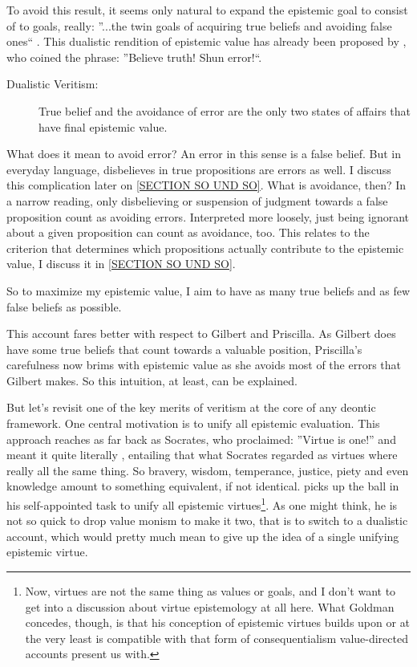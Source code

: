 \documentclass[12pt,numbers=noenddot]{scrartcl}
\begin{document}
To avoid this result, it seems only natural to expand the epistemic goal to consist of to goals, really: ”...the twin goals of acquiring true beliefs and avoiding false ones“ \textcite[339]{Berker2013-BERETA-2}. This dualistic rendition of epistemic value has already been proposed by \textcite[17]{James1896-JAMTWT-19}, who coined the phrase: ”Believe truth! Shun error!“.

\begin{description}
    \item[Dualistic Veritism:] True belief and the avoidance of error are the only two states of affairs that have final epistemic value.
\end{description}
\label{SECTION SO UND SO}
What does it mean to avoid error? An error in this sense \textcite[362]{Berker2013-BERETA-2} is a false belief. But in everyday language, disbelieves in true propositions are errors as well. I discuss this complication later on \ref{SECTION SO UND SO}. What is avoidance, then? In a narrow reading, only disbelieving or suspension of judgment towards a false proposition count as avoiding errors. Interpreted more loosely, just being ignorant about a given proposition can count as avoidance, too. This relates to the criterion that determines which propositions actually contribute to the epistemic value, I discuss it in \ref{SECTION SO UND SO}.

So to maximize my epistemic value, I aim to have as many true beliefs and as few false beliefs as possible.

This account fares better with respect to Gilbert and Priscilla. As Gilbert does have some true beliefs that count towards a valuable position, Priscilla’s carefulness now brims with epistemic value as she avoids most of the errors that Gilbert makes. So this intuition, at least, can be explained.

But let's revisit one of the key merits of veritism at the core of any deontic framework. One central motivation is to unify all epistemic evaluation. This approach reaches as far back as Socrates, who proclaimed: ”Virtue is one!” and meant it quite literally \textcite{penner1973}, entailing that what Socrates regarded as virtues where really all the same thing. So bravery, wisdom, temperance, justice, piety and even knowledge amount to something equivalent, if not identical.
\textcite{Goldman2002-GOLTUO-2} picks up the ball in his self-appointed task to unify all epistemic virtues\footnote{Now, virtues are not the same thing as values or goals, and I don't want to get into a discussion about virtue epistemology at all here. What Goldman concedes, though, is that his conception of epistemic virtues builds upon or at the very least is compatible with that form of consequentialism value-directed accounts present us with.}. As one might think, he is not so quick to drop value monism to make it two, that is to switch to a dualistic account, which would pretty much mean to give up the idea of a single unifying epistemic virtue.
\end{document}
